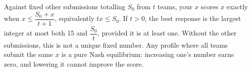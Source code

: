 Against fixed other submissions totalling $S_0$ from $t$ teams, your $x$ scores $x$ exactly when $x\le\dfrac{S_0+x}{t+1}$, equivalently $tx\le S_0$. If $t>0$, the best response is the largest integer at most both 15 and $\dfrac{S_0}{t}$, provided it is at least one. Without the other submissions, this is not a unique fixed number. Any profile where all teams submit the same $x$ is a pure Nash equilibrium: increasing one's number earns zero, and lowering it cannot improve the score.
